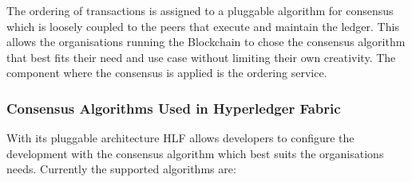 The ordering of transactions is assigned to a pluggable algorithm for consensus which is loosely coupled to the peers that execute and maintain the ledger. This allows the organisations running the Blockchain to chose the consensus algorithm that best fits their need and use case without limiting their own creativity. The component where the consensus is applied is the ordering service. 

\subsubsection{Consensus Algorithms Used in Hyperledger Fabric}

With its pluggable architecture HLF allows developers to configure the development with the consensus algorithm which best suits the organisations needs. Currently the supported algorithms\cite{orderingservice} are: 

